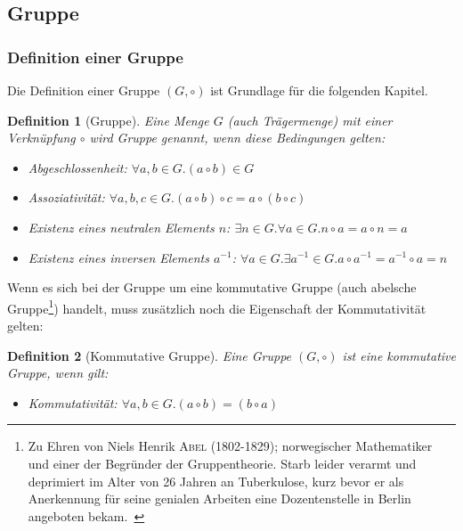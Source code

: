 \documentclass[12pt,a4paper, usenames, dvipsnames]{article}
\theoremstyle{mystyle}
\newtheorem{definition}{Definition}
\theoremstyle{definition}
\begin{document}
\subsection{Gruppe}
\label{Abschnitt_Gruppe}

\subsubsection*{Definition einer Gruppe}

Die Definition einer Gruppe $(G, \circ)$ ist Grundlage für die folgenden Kapitel. 

\begin{definition}[Gruppe]
Eine Menge $G$ (auch Trägermenge) mit einer Verknüpfung $\circ$ wird Gruppe genannt, wenn diese Bedingungen gelten: 
\vspace*{-0.5em}
\begin{itemize}
\item Abgeschlossenheit: $\forall a,b \in G.(a \circ b) \in G $
\item Assoziativität: $\forall a,b,c \in G.(a \circ b) \circ c = a \circ (b \circ c)$
\item Existenz eines neutralen Elements $n$: $\exists n \in G. \forall a \in G.n \circ a = a \circ n = a$ 
\item Existenz eines inversen Elements $a^{-1}$: $\forall a \in G. \exists a^{-1} \in G. a \circ a^{-1} = a^{-1} \circ a = n$ 
\end{itemize}
\end{definition}

Wenn es sich bei der Gruppe um eine kommutative Gruppe (auch abelsche Gruppe\footnote{\glqq Zu Ehren von Niels Henrik \textsc{Abel} (1802-1829); norwegischer Mathematiker und einer der Begründer der Gruppentheorie. Starb leider verarmt und deprimiert im Alter von 26 Jahren an Tuberkulose, kurz bevor er als Anerkennung für seine genialen Arbeiten  eine Dozentenstelle in Berlin angeboten bekam.\grqq \  \cite[S.21, Z.23]{Buch}}) handelt, muss zusätzlich noch die Eigenschaft der Kommutativität gelten: 

\begin{definition}[Kommutative Gruppe]
Eine Gruppe $(G, \circ)$ ist eine kommutative Gruppe, wenn gilt:
\vspace*{-0.5em}
\begin{itemize}
\item Kommutativität: $\forall a,b \in G.(a \circ b) = (b \circ a) $
\end{itemize}
\end{definition}
\vspace*{0.1cm}
\end{document}
